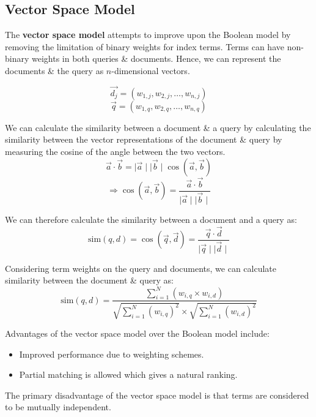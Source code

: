 \documentclass[a4paper,11pt]{article}
\begin{document}
\subsection{Vector Space Model}
The \textbf{vector space model} attempts to improve upon the Boolean model by removing the limitation of binary 
weights for index terms.
Terms can have non-binary weights in both queries \& documents.
Hence, we can represent the documents \& the query as $n$-dimensional vectors.

$$
\vec{d_j} = (w_{1,j}, w_{2,j}, \dots, w_{n,j})
$$
$$
\vec{q} = (w_{1,q}, w_{2,q}, \dots, w_{n,q})
$$

We can calculate the similarity between a document \& a query by calculating the similarity between the vector 
representations of the document \& query by measuring the cosine of the angle between the two vectors.
$$
\vec{a} \cdot \vec{b} = \mid \vec{a} \mid \mid \vec{b} \mid \cos (\vec{a}, \vec{b})
$$
$$
\Rightarrow \cos (\vec{a}, \vec{b}) = \frac{\vec{a} \cdot \vec{b}}{\mid \vec{a} \mid \mid \vec{b} \mid}
$$

We can therefore calculate the similarity between a document and a query as:
$$
\text{sim}(q,d) = \cos (\vec{q}, \vec{d}) = \frac{\vec{q} \cdot \vec{d}}{\mid \vec{q} \mid \mid \vec{d} \mid}
$$

Considering term weights on the query and documents, we can calculate similarity between the document \& query as:
$$
\text{sim}(q,d) =
\frac
{\sum^N_{i=1} (w_{i,q} \times w_{i,d})}
{\sqrt{\sum^N_{i=1} (w_{i,q})^2} \times \sqrt{\sum^N_{i=1} (w_{i,d})^2} }
$$

Advantages of the vector space model over the Boolean model include:
\begin{itemize}
    \item   Improved performance due to weighting schemes.
    \item   Partial matching is allowed which gives a natural ranking.
\end{itemize}

The primary disadvantage of the vector space model is that terms are considered to be mutually independent.
\end{document}
